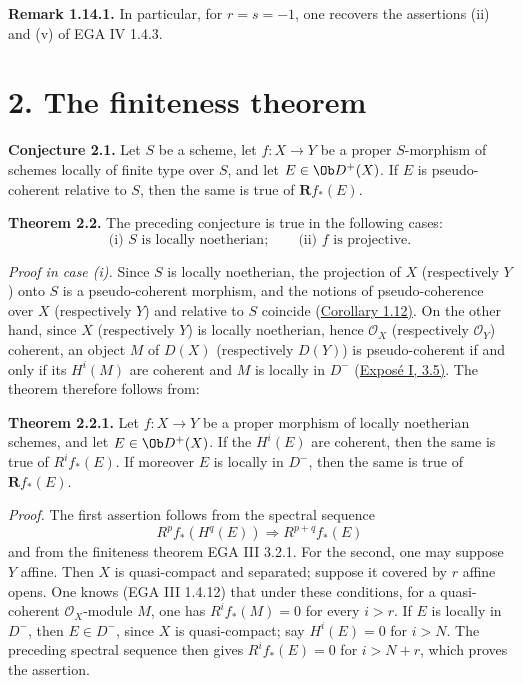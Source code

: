 \textbf{Remark 1.14.1.} In particular, for \(r=s=-1\), one recovers the assertions (ii) and (v) of EGA IV 1.4.3.

\section*{2. The finiteness theorem}

\textbf{Conjecture 2.1.} Let \(S\) be a scheme, let \(f:X\to Y\) be a proper \(S\)-morphism of schemes locally of finite type over \(S\), and let \(E\in \Ob D^+(X)\). If \(E\) is pseudo-coherent relative to \(S\), then the same is true of \(\mathbf R f_*(E)\).

\textbf{Theorem 2.2.} The preceding conjecture is true in the following cases:
\[
  \text{(i) } S\text{ is locally noetherian};\qquad
  \text{(ii) } f\text{ is projective}.
\]

\emph{Proof in case (i).} Since \(S\) is locally noetherian, the projection of \(X\) (respectively \(Y\)) onto \(S\) is a pseudo-coherent morphism, and the notions of pseudo-coherence over \(X\) (respectively \(Y\)) and relative to \(S\) coincide (\hyperlink{sga6.e03.cor.1-12}{Corollary 1.12)}. On the other hand, since \(X\) (respectively \(Y\)) is locally noetherian, hence \(\mathcal O_X\) (respectively \(\mathcal O_Y\)) coherent, an object \(M\) of \(D(X)\) (respectively \(D(Y)\)) is pseudo-coherent if and only if its \(H^i(M)\) are coherent and \(M\) is locally in \(D^{-}\) (\hyperlink{sga6.e01.cor.3-5}{Exposé I, 3.5)}. The theorem therefore follows from:

\textbf{Theorem 2.2.1.} Let \(f:X\to Y\) be a proper morphism of locally noetherian schemes, and let \(E\in \Ob D^+(X)\). If the \(H^i(E)\) are coherent, then the same is true of \(R^if_*(E)\). If moreover \(E\) is locally in \(D^{-}\), then the same is true of \(\mathbf Rf_*(E)\).

\emph{Proof.} The first assertion follows from the spectral sequence
\[
  R^pf_*(H^q(E)) \Longrightarrow R^{p+q}f_*(E)
\]
and from the finiteness theorem EGA III 3.2.1. For the second, one may suppose \(Y\) affine. Then \(X\) is quasi-compact and separated; suppose it covered by \(r\) affine opens. One knows (EGA III 1.4.12) that under these conditions, for a quasi-coherent \(\mathcal O_X\)-module \(M\), one has \(R^if_*(M)=0\) for every \(i>r\). If \(E\) is locally in \(D^{-}\), then \(E\in D^{-}\), since \(X\) is quasi-compact; say \(H^i(E)=0\) for \(i>N\). The preceding spectral sequence then gives \(R^if_*(E)=0\) for \(i>N+r\), which proves the assertion.

